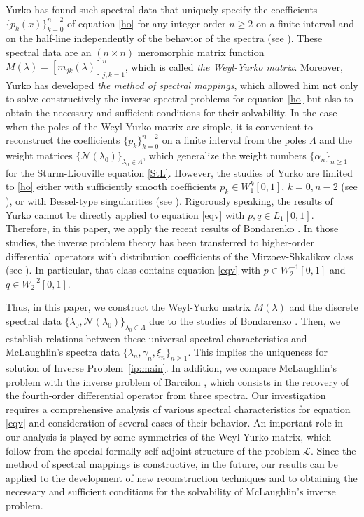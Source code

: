 \documentclass[a4paper,12pt]{article}
\newcommand{\al}{\alpha}
\newcommand{\ga}{\gamma}
\newcommand{\la}{\lambda}
\theoremstyle{plain}
\numberwithin{equation}{section}
\theoremstyle{definition}
\theoremstyle{remark}
\begin{document}
Yurko has found such spectral data that uniquely specify the coefficients $\{ p_k(x) \}_{k = 0}^{n-2}$ of equation \eqref{ho} for any integer order $n \ge 2$ on a finite interval and on the half-line independently of the behavior of the spectra (see \cite{Yur92, Yur02}). These spectral data are an $(n \times n)$ meromorphic matrix function $M(\la) = [m_{jk}(\la)]_{j,k = 1}^n$, which is called \textit{the Weyl-Yurko matrix}. Moreover, Yurko has developed \textit{the method of spectral mappings}, which allowed him not only to solve constructively the inverse spectral problems for equation \eqref{ho} but also to obtain the necessary and sufficient conditions for their solvability. In the case when the poles of the Weyl-Yurko matrix are simple, it is convenient to reconstruct the coefficients $\{ p_k \}_{k = 0}^{n-2}$ on a finite interval from the poles $\Lambda$ and the weight matrices $\{ \mathcal N(\la_0) \}_{\la_0 \in \Lambda}$, which generalize the weight numbers $\{ \al_n \}_{n \ge 1}$ for the Sturm-Liouville equation \eqref{StL}.
However, the studies of Yurko are limited to \eqref{ho} either with sufficiently smooth coefficients $p_k \in W_1^k[0,1]$, $k = \overline{0,n-2}$ (see \cite{Yur92}), or  with Bessel-type singularities (see \cite{Yur93, Yur95}). Rigorously speaking, the results of Yurko cannot be directly applied to equation \eqref{eqv}  with $p, q \in L_1[0,1]$.
Therefore, in this paper, we apply the recent results of Bondarenko \cite{Bond21, Bond22-alg, Bond23-mmas, Bond23-reg}. In those studies, the inverse problem theory has been transferred to higher-order differential operators with distribution coefficients of the Mirzoev-Shkalikov class (see \cite{MS16}). In particular, that class contains equation \eqref{eqv} with $p \in W_2^{-1}[0,1]$ and $q \in W_2^{-2}[0,1]$.

Thus, in this paper, we construct the Weyl-Yurko matrix $M(\la)$ and the discrete spectral data $\{ \la_0, \mathcal N(\la_0) \}_{\la_0 \in \Lambda}$ due to the studies of Bondarenko \cite{Bond21, Bond22-alg, Bond23-mmas, Bond23-reg}. Then, we establish relations between these universal spectral characteristics and McLaughlin's spectra data $\{ \la_n, \ga_n, \xi_n \}_{n \ge 1}$.
This implies the uniqueness for solution of Inverse Problem~\ref{ip:main}. In addition, we compare McLaughlin's problem with the inverse problem of Barcilon \cite{Bar74-1, Bar74-2}, which consists in the recovery of the fourth-order differential operator from three spectra.
Our investigation requires a comprehensive analysis of various spectral characteristics for equation \eqref{eqv} and consideration of several cases of their behavior. An important role in our analysis is played by some symmetries of the Weyl-Yurko matrix, which follow from the special formally self-adjoint structure of the problem $\mathcal L$. 
Since the method of spectral mappings is constructive, in the future, our results can be applied to the development of new reconstruction techniques and to obtaining the necessary and sufficient conditions for the solvability of McLaughlin's inverse problem.
\end{document}
